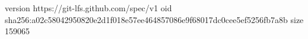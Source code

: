 version https://git-lfs.github.com/spec/v1
oid sha256:a02c58042950820e2d1f018e57ee464857086e9f68017dc0cee5ef5256fb7a8b
size 159065
